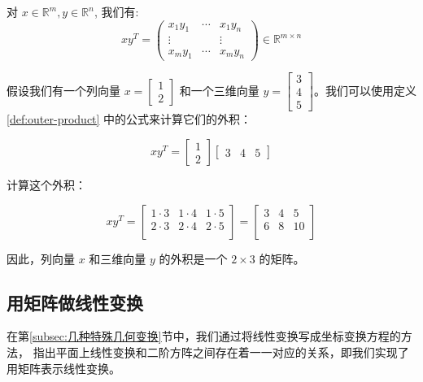 \begin{definition}[外积] \label{def:outer-product} 
对 $x \in \mathbb{R}^m, y \in \mathbb{R}^n$, 我们有:
$$
x y^T=\left(\begin{array}{ccc}
x_1 y_1 & \cdots & x_1 y_n \\
\vdots & & \vdots \\
x_m y_1 & \cdots & x_m y_n
\end{array}\right) \in \mathbb{R}^{m \times n}
$$
\end{definition}

\begin{exercise}
    假设我们有一个列向量 $x = \begin{bmatrix} 1 \\ 2 \end{bmatrix}$ 和一个三维向量 $y = \begin{bmatrix} 3 \\ 4 \\ 5 \end{bmatrix}$。我们可以使用定义 \ref{def:outer-product} 中的公式来计算它们的外积：

\[
x y^T = \begin{bmatrix} 1 \\ 2 \end{bmatrix} \begin{bmatrix} 3 & 4 & 5 \end{bmatrix}
\]

计算这个外积：

\[
x y^T = \begin{bmatrix}
1 \cdot 3 & 1 \cdot 4 & 1 \cdot 5 \\
2 \cdot 3 & 2 \cdot 4 & 2 \cdot 5 \\
\end{bmatrix} = \begin{bmatrix}
3 & 4 & 5 \\
6 & 8 & 10 \\
\end{bmatrix}
\]

因此，列向量 $x$ 和三维向量 $y$ 的外积是一个 $2 \times 3$ 的矩阵。
\end{exercise}


\subsection{用矩阵做线性变换}

在第\ref{subsec:几种特殊几何变换}节中，我们通过将线性变换写成坐标变换方程的方法，
指出平面上线性变换和二阶方阵之间存在着一一对应的关系，即我们实现了用矩阵表示线性变换。

